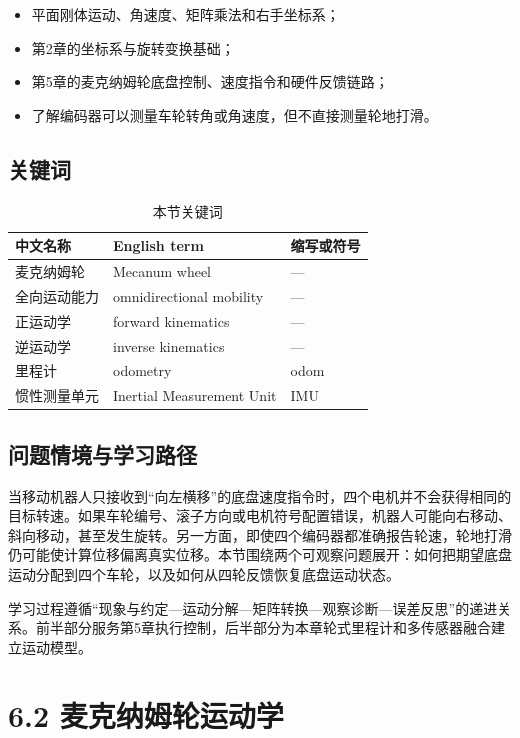 \documentclass[UTF8,zihao=-4]{ctexart}
\begin{document}
\begin{itemize}
  \item 平面刚体运动、角速度、矩阵乘法和右手坐标系；
  \item 第2章的坐标系与旋转变换基础；
  \item 第5章的麦克纳姆轮底盘控制、速度指令和硬件反馈链路；
  \item 了解编码器可以测量车轮转角或角速度，但不直接测量轮地打滑。
\end{itemize}

\subsection*{关键词}

\begin{table}[htbp]
  \centering
  \caption*{本节关键词}
  \begin{tabular}{lll}
    \toprule
    中文名称 & English term & 缩写或符号 \\
    \midrule
    麦克纳姆轮 & Mecanum wheel & --- \\
    全向运动能力 & omnidirectional mobility & --- \\
    正运动学 & forward kinematics & --- \\
    逆运动学 & inverse kinematics & --- \\
    里程计 & odometry & odom \\
    惯性测量单元 & Inertial Measurement Unit & IMU \\
    \bottomrule
  \end{tabular}
\end{table}

\subsection*{问题情境与学习路径}

当移动机器人只接收到“向左横移”的底盘速度指令时，四个电机并不会获得相同的目标转速。如果车轮编号、滚子方向或电机符号配置错误，机器人可能向右移动、斜向移动，甚至发生旋转。另一方面，即使四个编码器都准确报告轮速，轮地打滑仍可能使计算位移偏离真实位移。本节围绕两个可观察问题展开：如何把期望底盘运动分配到四个车轮，以及如何从四轮反馈恢复底盘运动状态。

学习过程遵循“现象与约定---运动分解---矩阵转换---观察诊断---误差反思”的递进关系。前半部分服务第5章执行控制，后半部分为本章轮式里程计和多传感器融合建立运动模型。

\section*{6.2 麦克纳姆轮运动学}
\end{document}
